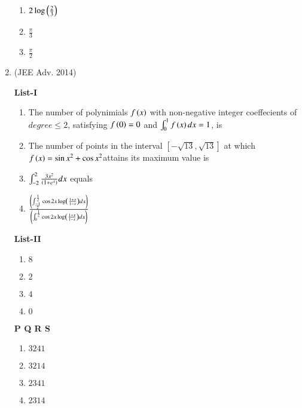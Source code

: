 \documentclass[journal,12pt,onecolumn]{IEEEtran}
\theoremstyle{remark}
\begin{document}
\begin{enumerate}
\begin{multicols}{2}
\begin{enumerate}
					\item $2\log\left(\frac{2}{3}\right)$

					\item $\frac{\pi}{3}$

					\item $\frac{\pi}{2}$
				\end{enumerate}
			\end{multicols}


		\item 
			\hfill{(JEE Adv. 2014)}
			\begin{multicols}{2}
				\textbf{List-I} 
				\begin{enumerate}
					\item The number of polynimials $f\left(x\right)$ with non-negative integer coeffecients of $degree \leq 2$, satisfying $f\left(0\right)=0$ and $\int_{0}^{1}f\left(x\right)dx=1$, is
					\item The number of points in the interval $\left[-\sqrt{13},\sqrt{13}\right]$ at which $f\left(x\right)= \sin x^{2}+\cos x^{2}$attains its maximum value is
					\item $\int_{-2}^{2}\frac{3x^{2}}{\left(1+e^{x}\right)}dx$ equals
					\item $\frac{\left(\int_{\frac{-1}{2}}^{\frac{1}{2}}\cos 2x\log\left(\frac{1+x}{1-x}\right)dx\right)}{\left(\int_{0}^{\frac{1}{2}}\cos 2x\log\left(\frac{1+x}{1-x}\right)dx\right)}$
				\end{enumerate}
				\columnbreak
				\textbf{List-II}
				\begin{enumerate}
					\item $8$

					\item $2$

					\item $4$

					\item $0$
				\end{enumerate}
		\end{multicols}
			\textbf{   P Q R S}
			\begin{enumerate}
		
				\item $3 2 4 1$
				\item $3 2 1 4$
				\item $2 3 4 1$
				\item $2 3 1 4$
			\end{enumerate}
	\end{enumerate}
\end{document}
